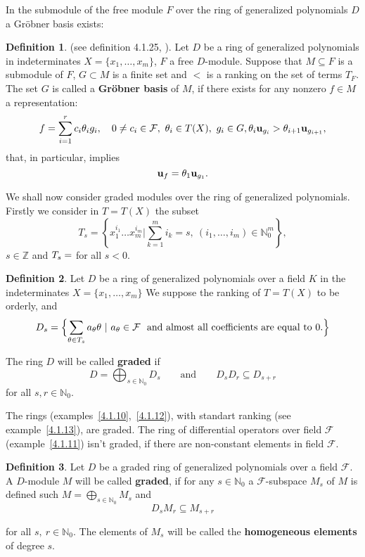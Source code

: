 \documentclass[a4paper,reqno,12pt]{amsart}
\theoremstyle{plain}
\theoremstyle{remark}
\theoremstyle{definition}
\newtheorem{definition}{Definition}
\def\u{\bold {u}}
\newcommand{\N}{\mathbb{N}}
\newcommand{\Z}{\mathbb{Z}}
\def\F{\mathcal {F}}
\begin{document}
In the submodule of the free module $F$ over the ring of generalized
polynomials $D$
  a Gr\"obner basis exists:
\begin{definition} (see definition 4.1.25, \cite{KLMP}).
Let $D$ be a ring of generalized polynomials in indeterminates
$X=\{x_1,\dots,x_m\}$, $F$ a free $D$-module. Suppose that $M
\subseteq F$ is a submodule of $F$, $G \subset M$ is a finite set 
and $<$
is a ranking on the set of terms $T_F$. The set $G$ is called a 
{\bf Gr\"obner
basis} of $M$, if there exists for any nonzero 
$f\in M$ a
 representation:
$$
  f=\sum_{i=1}^r c_i\theta_ig_i,\quad  0\ne c_i\in \F,\  \theta_i
       \in  T(X),\ g_i  \in  G,\\
  \theta_i\u_{g_i}> \theta_{i+1}  \u_{g_{i+1}},
$$
that, in particular, implies
$$
  \u_f = \theta _1 \u_{g_1}.
$$
\end{definition}
 
We shall now consider graded modules over the ring of generalized
polynomials. Firstly  we consider in $T=T(X)$ the subset
$$
 T_s=\left\{x_1^{i_1}\dots x_m^{i_m}| \sum_{k=1}^m i_k=s,\ (i_1,\dots,i_m)\in\N_0^m \right\},
$$
$s\in\Z$ and  $T_s=\empty$ for all $s<0$.

\begin{definition}
Let $D$ be a ring of generalized polynomials over a field $K$ in
the indeterminates $X=\{x_1,\dots,x_m\}$
 We suppose the ranking of $T=T(X)$ to be orderly, and
$$
 D_s=\Bigl\{\sum_{\theta\in T_s} a_\theta\theta\ |\
a_\theta\in \F\ 
\vtop{\hbox{
and almost all coefficients } }\hbox{%
are equal to 0.}  
\Bigr\}
$$

The ring $D$ will be called {\bf graded} if
$$
  D=\bigoplus_{s\in\N_0} D_{s}\qquad\text{and}\qquad
  D_{s} D_{r}\subseteq D_{s+r}
  $$
for all $s,r\in\N_0$.
\end{definition}

The rings (examples~\ref{4.1.10},~\ref{4.1.12}), 
with standart ranking
(see example~\ref{4.1.13}),  are graded.
The ring of differential operators over field
$\F$ (example~\ref{4.1.11}) 
isn't graded, if
there are non-constant elements in field
 $\F$.

\begin{definition}
Let $D$ be a graded ring of generalized polynomials over a field 
$\F$.
A $D$-module $M$ will be called {\bf graded}, if for any 
$s\in\N_0$     a $\F$-subspace $M_{s}$ of $M$ is defined such
 $M=\bigoplus_{s\in\N_0} M_{s}$ and
$$
  D_{s} M_{r}\subseteq M_{s+r}
$$
  
for all $s,\ r\in\N_0$. The elements of $M_{s}$ will
be called the {\bf homogeneous elements} of degree $s$.
\end{definition}
\end{document}
